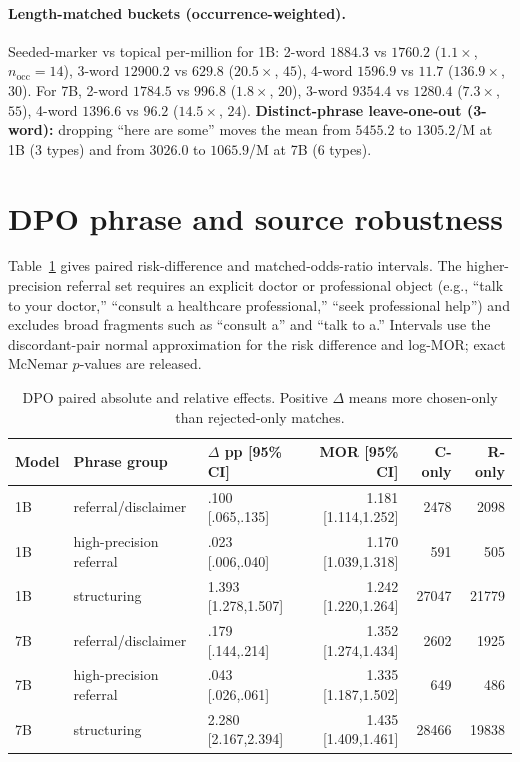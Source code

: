 \documentclass[11pt]{article}
\begin{document}
\paragraph{Length-matched buckets (occurrence-weighted).} Seeded-marker vs
topical per-million for 1B: 2-word $1884.3$ vs $1760.2$ ($1.1\times$, $n_{\text{occ}}{=}14$),
3-word $12900.2$ vs $629.8$ ($20.5\times$, $45$), 4-word $1596.9$ vs $11.7$
($136.9\times$, $30$). For 7B, 2-word $1784.5$ vs $996.8$ ($1.8\times$, $20$),
3-word $9354.4$ vs $1280.4$ ($7.3\times$, $55$), 4-word $1396.6$ vs $96.2$
($14.5\times$, $24$). \textbf{Distinct-phrase leave-one-out (3-word):}
dropping ``here are some'' moves the mean from $5455.2$ to $1305.2$/M at 1B
(3 types) and from $3026.0$ to $1065.9$/M at 7B (6 types).

\section{DPO phrase and source robustness}
\label{app:dpo-robustness}

Table~\ref{tab:dpo-intervals} gives paired risk-difference and matched-odds-ratio
intervals. The higher-precision referral set requires an explicit doctor or
professional object (e.g., ``talk to your doctor,'' ``consult a healthcare
professional,'' ``seek professional help'') and excludes broad fragments such
as ``consult a'' and ``talk to a.'' Intervals use the discordant-pair normal
approximation for the risk difference and log-MOR; exact McNemar $p$-values are
released.

\begin{table}[h]
\centering
\small
\setlength{\tabcolsep}{4pt}
\begin{tabular}{lllrrr}
\toprule
Model & Phrase group & $\Delta$ pp [95\% CI] & MOR [95\% CI] & C-only & R-only \\
\midrule
1B & referral/disclaimer & .100 [.065,.135] & 1.181 [1.114,1.252] & 2478 & 2098 \\
1B & high-precision referral & .023 [.006,.040] & 1.170 [1.039,1.318] & 591 & 505 \\
1B & structuring & 1.393 [1.278,1.507] & 1.242 [1.220,1.264] & 27047 & 21779 \\
\midrule
7B & referral/disclaimer & .179 [.144,.214] & 1.352 [1.274,1.434] & 2602 & 1925 \\
7B & high-precision referral & .043 [.026,.061] & 1.335 [1.187,1.502] & 649 & 486 \\
7B & structuring & 2.280 [2.167,2.394] & 1.435 [1.409,1.461] & 28466 & 19838 \\
\bottomrule
\end{tabular}
\caption{DPO paired absolute and relative effects. Positive $\Delta$ means more
chosen-only than rejected-only matches.}
\label{tab:dpo-intervals}
\end{table}
\end{document}
